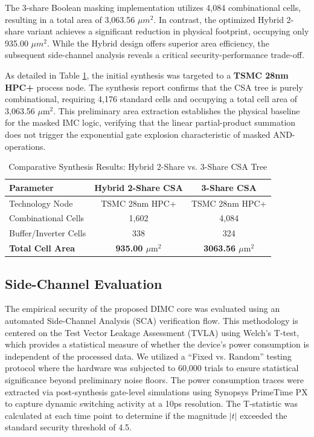 \documentclass[journal]{IEEEtran}
\begin{document}
The 3-share Boolean masking implementation utilizes 4,084 combinational cells, resulting in a total area of 3,063.56 $\mu m^2$. 
In contrast, the optimized Hybrid 2-share variant achieves a significant reduction in physical footprint, occupying only 935.00 $\mu m^2$. 
While the Hybrid design offers superior area efficiency, the subsequent side-channel analysis reveals a critical security-performance trade-off.

As detailed in Table \ref{tab:comp_synth_results}, the initial synthesis was targeted to a \textbf{TSMC 28nm HPC+} process node. The synthesis report confirms that the CSA tree is purely combinational, requiring 4,176 standard cells and occupying a total cell area of 3,063.56 $\mu\mathrm{m}^2$. This preliminary area extraction establishes the physical baseline for the masked IMC logic, verifying that the linear partial-product summation does not trigger the exponential gate explosion characteristic of masked AND-operations.

\begin{table}[h]
\renewcommand{\arraystretch}{1.3}
\caption{Comparative Synthesis Results: Hybrid 2-Share vs. 3-Share CSA Tree}
\label{tab:comp_synth_results}
\centering
\begin{tabular}{|l|c|c|}
\hline
\textbf{Parameter} & \textbf{Hybrid 2-Share CSA} & \textbf{3-Share CSA} \\
\hline
\hline
Technology Node & TSMC 28nm HPC+ & TSMC 28nm HPC+ \\
\hline
Combinational Cells & 1,602 & 4,084 \\
\hline
Buffer/Inverter Cells & 338 & 324 \\
\hline
\textbf{Total Cell Area} & \textbf{935.00 $\mu\mathrm{m}^2$} & \textbf{3063.56 $\mu\mathrm{m}^2$} \\
\hline
\end{tabular}
\end{table}


\subsection{Side-Channel Evaluation}
The empirical security of the proposed DIMC core was evaluated using an automated Side-Channel Analysis (SCA) verification flow. This methodology is centered on the Test Vector Leakage Assessment (TVLA) using Welch's T-test, which provides a statistical measure of whether the device's power consumption is independent of the processed data. We utilized a ``Fixed vs. Random'' testing protocol where the hardware was subjected to 60,000 trials to ensure statistical significance beyond preliminary noise floors. The power consumption traces were extracted via post-synthesis gate-level simulations using Synopsys PrimeTime PX to capture dynamic switching activity at a 10ps resolution. The T-statistic was calculated at each time point to determine if the magnitude $|t|$ exceeded the standard security threshold of 4.5.
\end{document}
